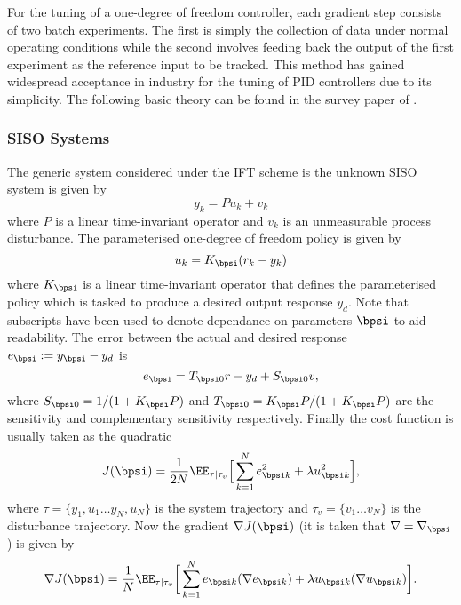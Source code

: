For the tuning of a one-degree of freedom controller, each gradient step consists of two batch experiments. The first is simply the collection of data under normal operating conditions while the second involves feeding back the output of the first experiment as the reference input to be tracked. This method has gained widespread acceptance in industry for the tuning of PID controllers due to its simplicity. The following basic theory can be found in the survey paper of \cite{Hja02}.

\subsubsection{SISO Systems}
The generic system considered under the IFT scheme is the unknown SISO system is given by 
\begin{equation}
y_k = P u_k + v_k
\end{equation}
where $P$ is a linear time-invariant operator and $v_k$ is an unmeasurable process disturbance. The parameterised one-degree of freedom policy is given by
\begin{equation}
u_k = K_{\bpsi} (r_k - y_k)
\end{equation}
where $K_{\bpsi}$ is a linear time-invariant operator that defines the parameterised policy which is tasked to produce a desired output response $y_d$. Note that subscripts have been used to denote dependance on parameters $\bpsi$ to aid readability. The error between the actual and desired response $e_{\bpsi} := y_{\bpsi} - y_d$ is
\begin{equation}
e_{\bpsi} 
= T_{\bpsi 0} r - y_d + S_{\bpsi 0} v,
\end{equation}
where $S_{\bpsi 0} = 1/(1 + K_{\bpsi} P)$ and $T_{\bpsi 0} = K_{\bpsi} P/(1 + K_{\bpsi} P)$ are the sensitivity and complementary sensitivity respectively. Finally the cost function is usually taken as the quadratic
\begin{equation}
J(\bpsi) = \frac{1}{2N} \EE_{\tau|\tau_v} \Big[ \sum_{k=1}^N e_{\bpsi k}^2 + \lambda u_{\bpsi k}^2 \Big],
\end{equation}
where $\tau = \{ y_1, u_1 \dots y_N, u_N \}$ is the system trajectory and $\tau_v = \{ v_1 \dots v_N \}$ is the disturbance trajectory. Now the gradient $\nabla J(\bpsi)$ (it is taken that $\nabla = \nabla_{\bpsi}$) is given by
\begin{equation}
\nabla J(\bpsi) = \frac{1}{N} \EE_{\tau|\tau_v} \bigg[ \sum_{k=1}^N
e_{\bpsi k} (\nabla e_{\bpsi k}) + \lambda u_{\bpsi k} (\nabla  u_{\bpsi k}) \bigg].
\end{equation}
